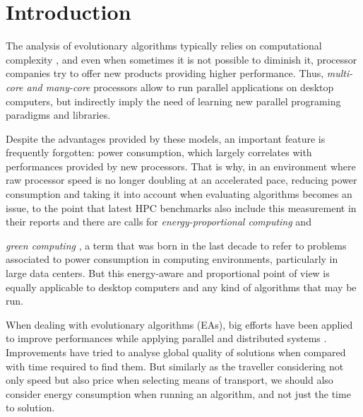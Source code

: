 \section{Introduction}

The analysis of evolutionary algorithms typically relies on computational complexity \cite{complexity}, %
 and even when sometimes it is not possible to diminish it, processor
 companies try to offer new products providing higher performance.
 Thus, \textit{multi-core and many-core} processors allow to run
 parallel applications on desktop computers, but indirectly imply the
 need of learning new parallel programing paradigms and libraries. %

Despite the advantages provided by these models, an important feature
is frequently forgotten:  power consumption, which largely correlates
with performances provided by new processors. That is why, in an
environment where raw processor speed is no longer doubling at an
accelerated pace, reducing power consumption and taking it into
account when evaluating algorithms becomes an issue, to the point that
latest HPC benchmarks also include this measurement in their reports
and there are calls for {\em energy-proportional computing}
\cite{barroso2007case} and 
                   
\textit{green computing} \cite{green-computing}, a term that was born in the last decade to refer
to problems associated to power consumption in computing environments,
particularly in large data centers. But this
energy-aware and proportional point of view is equally applicable to desktop computers
and any kind of algorithms that may be run. 

When dealing with evolutionary algorithms (EAs), big efforts have been
applied to improve performances while applying parallel and
distributed systems \cite{paba}.  Improvements have tried to analyse
global quality of solutions when compared with time required to find
them.   
But similarly as the traveller considering not only speed but also
price when selecting means of transport, we should also consider
energy consumption when running an algorithm, and not just the time to
solution.  %

